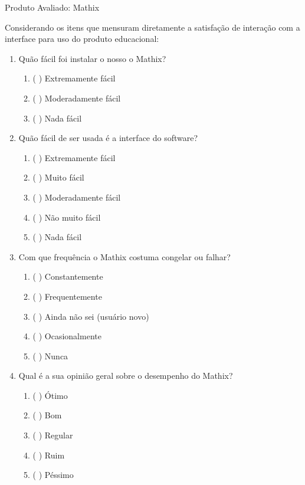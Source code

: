 \begin{apendicesenv}
\begin{center}
Produto Avaliado: Mathix    
\end{center}


Considerando os itens que mensuram diretamente a satisfação de interação com a interface para uso do produto educacional:




\begin{enumerate}
    
    \item Quão fácil foi instalar o nosso o Mathix?
    \begin{enumerate}
        \item ( ) Extremamente fácil
        \item ( ) Moderadamente fácil
        \item ( ) Nada fácil\\
    \end{enumerate}


    \item Quão fácil de ser usada é a interface do software?
    \begin{enumerate}
        \item ( ) Extremamente fácil
        \item ( ) Muito fácil
        \item ( ) Moderadamente fácil
        \item ( ) Não muito fácil
        \item ( ) Nada fácil            
    \end{enumerate}


    \item Com que frequência o Mathix costuma congelar ou falhar?
    \begin{enumerate}
        \item ( ) Constantemente
        \item ( ) Frequentemente
        \item ( ) Ainda não sei (usuário novo)
        \item ( ) Ocasionalmente
        \item ( ) Nunca          
    \end{enumerate}


    \item Qual é a sua opinião geral sobre o desempenho do Mathix?
    \begin{enumerate}
        \item ( ) Ótimo
        \item ( ) Bom
        \item ( ) Regular
        \item ( ) Ruim
        \item ( ) Péssimo
    \end{enumerate}



\end{enumerate}
\end{apendicesenv}
